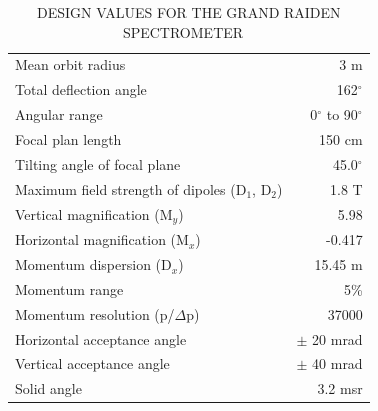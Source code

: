 \begin{table}[tpb]
  \setlength{\capwidth}{0.7\textwidth}
  \begin{center}
    \caption{DESIGN VALUES FOR THE GRAND RAIDEN SPECTROMETER ~\citep{Fujiwara1999484} }
    \label{tb:GR}
    \begin{tabular}{lr} \toprule
      \hline
      Mean orbit radius                         &           3 m \\
      Total deflection angle                    &           162$^{\circ}$\\
      Angular range                             &           0$^{\circ}$ to 90$^{\circ}$\\
      Focal plan length                         &           150 cm\\
      Tilting angle of focal plane              &           45.0$^{\circ}$\\
      Maximum field strength of dipoles (D$_1$, D$_2$)    &       1.8 T\\
      Vertical magnification (M$_y$)            &           5.98\\
      Horizontal magnification (M$_x$)          &           -0.417\\
      Momentum dispersion (D$_x$)               &           15.45 m\\
      Momentum range                            &           5\%\\
      Momentum resolution (p/$\Delta$p)         &           37000\\
      Horizontal acceptance angle               &           $\pm$ 20 mrad\\
      Vertical acceptance angle                 &           $\pm$ 40 mrad\\
      Solid angle                               &           3.2 msr \\\bottomrule
    \end{tabular}
  \end{center}
\end{table}



